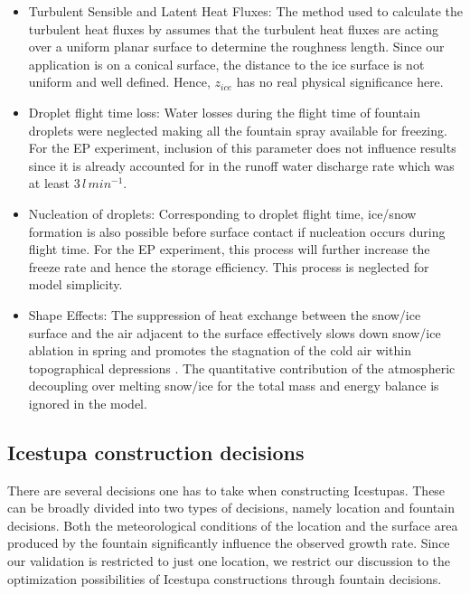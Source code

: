 \documentclass[utf8]{frontiersSCNS} %
\begin{document}
\begin{itemize}

\item  Turbulent Sensible and Latent Heat Fluxes: The method used to calculate the turbulent heat fluxes by
  \cite{Garratt_1992} assumes that the turbulent heat fluxes are acting over a uniform planar surface to determine the
  roughness length. Since our application is on a conical surface, the distance to the ice surface is not
  uniform and well defined. Hence, $z_{ice}$ has no real physical significance here.

\item Droplet flight time loss: Water losses during the flight time of fountain droplets were neglected making all the
  fountain spray available for freezing. For the EP experiment, inclusion of this parameter does not influence
  results since it is already accounted for in the runoff water discharge rate which was at least $3\, l\,min^{-1}$.

\item Nucleation of droplets: Corresponding to droplet flight time, ice/snow formation is also possible before surface
  contact if nucleation occurs during flight time. For the EP experiment, this process will further increase
  the freeze rate and hence the storage efficiency. This process is neglected for model simplicity.
\item Shape Effects: The suppression of heat exchange between the snow/ice surface and the air adjacent to the surface
  effectively slows down snow/ice ablation in spring and promotes the stagnation of the cold air within topographical
  depressions \citep{Fujita_2010}. The quantitative contribution of the atmospheric decoupling over melting snow/ice
  for the total mass and energy balance is ignored in the model.

\end{itemize}

\subsection{Icestupa construction decisions} There are several decisions one has to take when constructing Icestupas.
These can be broadly divided into two types of decisions, namely location and fountain decisions.  Both the
meteorological conditions of the location and the surface area produced by the fountain significantly influence the
observed growth rate. Since our validation is restricted to just one location, we restrict our discussion to the
optimization possibilities of Icestupa constructions through fountain decisions.
\end{document}
